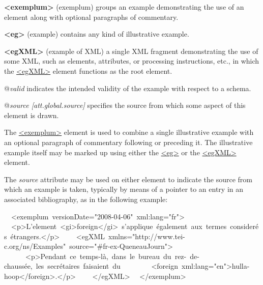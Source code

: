 \begin{sansreflist}
  
\item [\textbf{<exemplum>}] (exemplum) groups an example demonstrating the use of an element along with optional paragraphs of commentary.
\item [\textbf{<eg>}] (example) contains any kind of illustrative example.
\item [\textbf{<egXML>}] (example of XML) a single XML fragment demonstrating the use of some XML, such as elements, attributes, or processing instructions, etc., in which the \hyperref[TEI.egXML]{<egXML>} element functions as the root element.\hfil\\[-10pt]\begin{sansreflist}
    \item[@{\itshape valid}]
  indicates the intended validity of the example with respect to a schema.
    \item[@{\itshape source [att.global.source]}]
  specifies the source from which some aspect of this element is drawn.
\end{sansreflist}  
\end{sansreflist}
\par
The \hyperref[TEI.exemplum]{<exemplum>} element is used to combine a single illustrative example with an optional paragraph of commentary following or preceding it. The illustrative example itself may be marked up using either the \hyperref[TEI.eg]{<eg>} or the \hyperref[TEI.egXML]{<egXML>} element.\par
The {\itshape source} attribute may be used on either element to indicate the source from which an example is taken, typically by means of a pointer to an entry in an associated bibliography, as in the following example: \par\bgroup\exampleFont \begin{shaded}\noindent\mbox{}\newline
  <exemplum versionDate="2008-04-06" xml:lang="fr">\newline
  <p>L'element <gi>foreign</gi> s'applique également aux termes considerés étrangers.</p>\newline
    <egXML xmlns="http://www.tei-c.org/ns/Examples" source="\#fr-ex-Queneau\textunderscore Journ">\newline
      <p>Pendant ce temps-là, dans le bureau du rez- de-chaussée, les secrétaires faisaient du\newline
        <foreign xml:lang="en">hulla-hoop</foreign>.</p>\newline
    </egXML>\newline
  </exemplum>\newline
\end{shaded}\egroup\par \par
